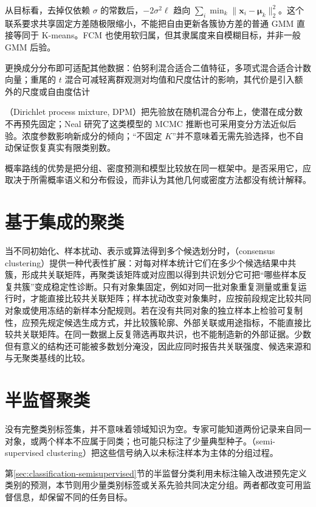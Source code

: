 从目标看，去掉仅依赖 $\sigma$ 的常数后，$-2\sigma^2\ell$ 趋向 $\sum_i\min_k\lVert\bm{x}_i-\bm{\mu}_k\rVert_2^2$。这个联系要求共享固定方差随极限缩小，不能把自由更新各簇协方差的普通 GMM 直接等同于 K-means。FCM 也使用软归属，但其隶属度来自模糊目标，并非一般 GMM 后验。

更换成分分布即可适配其他数据：伯努利混合适合二值特征，多项式混合适合计数向量；重尾的 $t$ 混合可减轻离群观测对均值和尺度估计的影响，其代价是引入额外的尺度或自由度估计

（Dirichlet process mixture, DPM）把先验放在随机混合分布上，使潜在成分数不再预先固定；Neal 研究了这类模型的 MCMC 推断也可采用变分方法近似后验。浓度参数影响新成分的倾向；“不固定 $K$”并不意味着无需先验选择，也不自动保证恢复真实有限类别数。

概率路线的优势是把分组、密度预测和模型比较放在同一框架中。是否采用它，应取决于所需概率语义和分布假设，而非认为其他几何或密度方法都没有统计解释。

\section{基于集成的聚类}
\label{sec:clustering-ensemble}

当不同初始化、样本扰动、表示或算法得到多个候选划分时，（consensus clustering）提供一种代表性扩展：对每对样本统计它们在多少个候选结果中共簇，形成共关联矩阵，再聚类该矩阵或对应图以得到共识划分它可把“哪些样本反复共簇”变成稳定性诊断。只有对象集固定，例如对同一批对象重复测量或重复运行时，才能直接比较共关联矩阵；样本扰动改变对象集时，应按前段规定比较共同对象或使用冻结的新样本分配规则。若在没有共同对象的独立样本上检验可复制性，应预先规定候选生成方式，并比较簇轮廓、外部关联或用途指标，不能直接比较共关联矩阵。在同一数据上反复筛选再取共识，也不能制造新的外部证据。少数但有意义的结构还可能被多数划分淹没，因此应同时报告共关联强度、候选来源和与无聚类基线的比较。

\section{半监督聚类}
\label{sec:clustering-semisupervised}

没有完整类别标签集，并不意味着领域知识为空。专家可能知道两份记录来自同一对象，或两个样本不应属于同类；也可能只标注了少量典型种子。（semi-supervised clustering）把这些信号纳入以未标注样本为主体的分组过程。

第\ref{sec:classification-semisupervised}节的半监督分类利用未标注输入改进预先定义类别的预测，本节则用少量类别标签或关系先验共同决定分组。两者都改变可用监督信息，却保留不同的任务目标。

